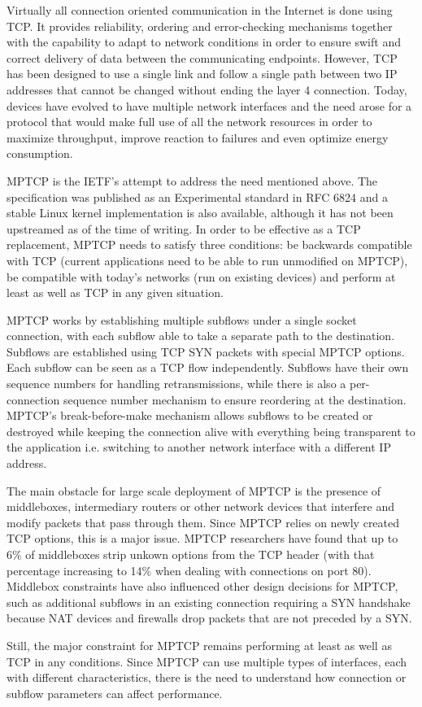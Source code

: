
Virtually all connection oriented communication in the Internet is done using TCP. It provides reliability, ordering and error-checking mechanisms together with the capability to adapt to network conditions in order to ensure swift and correct delivery of data between the communicating endpoints. However, TCP has been designed to use a single link and follow a single path between two IP addresses that cannot be changed without ending the layer 4 connection. Today, devices have evolved to have multiple network interfaces and the need arose for a protocol that would make full use of all the network resources in order to maximize throughput, improve reaction to failures and even optimize energy consumption.

MPTCP is the IETF's attempt to address the need mentioned above. The specification was published as an Experimental standard in RFC 6824 and a stable Linux kernel implementation is also available, although it has not been upstreamed as of the time of writing. In order to be effective as a TCP replacement, MPTCP needs to satisfy three conditions: be backwards compatible with TCP (current applications need to be able to run unmodified on MPTCP), be compatible with today's networks (run on existing devices) and perform at least as well as TCP in any given situation.

MPTCP works by establishing multiple subflows under a single socket connection, with each subflow able to take a separate path to the destination. Subflows are established using TCP SYN packets with special MPTCP options. Each subflow can be seen as a TCP flow independently. Subflows have their own sequence numbers for handling retransmissions, while there is also a per-connection sequence number mechanism to ensure reordering at the destination. MPTCP's break-before-make mechanism allows subflows to be created or destroyed while keeping the connection alive with everything being transparent to the application i.e. switching to another network interface with a different IP address.

The main obstacle for large scale deployment of MPTCP is the presence of middleboxes, intermediary routers or other network devices that interfere and modify packets that pass through them. Since MPTCP relies on newly created TCP options, this is a major issue. MPTCP researchers have found that up to 6\% of middleboxes strip unkown options from the TCP header (with that percentage increasing to 14\% when dealing with connections on port 80). Middlebox constraints have also influenced other design decisions for MPTCP, such as additional subflows in an existing connection requiring a SYN handshake because NAT devices and firewalls drop packets that are not preceded by a SYN.

Still, the major constraint for MPTCP remains performing at least as well as TCP in any conditions. Since MPTCP can use multiple types of interfaces, each with different characteristics, there is the need to understand how connection or subflow parameters can affect performance.

